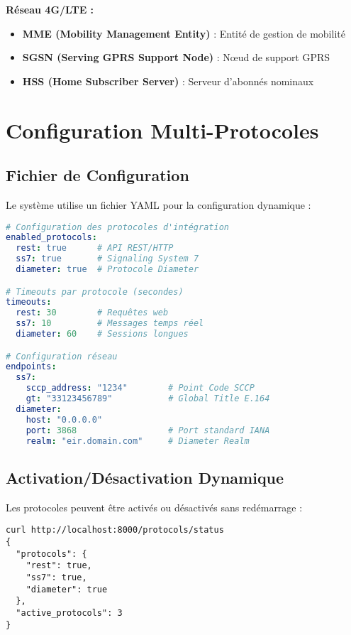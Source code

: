 \documentclass[11pt]{article}
\begin{document}
\textbf{Réseau 4G/LTE :}
\begin{itemize}
    \item \textbf{MME (Mobility Management Entity)} : Entité de gestion de mobilité
    \item \textbf{SGSN (Serving GPRS Support Node)} : Nœud de support GPRS
    \item \textbf{HSS (Home Subscriber Server)} : Serveur d'abonnés nominaux
\end{itemize}

\section{Configuration Multi-Protocoles}

\subsection{Fichier de Configuration}

Le système utilise un fichier YAML pour la configuration dynamique :

\begin{lstlisting}[language=yaml,caption=config/protocols.yml]
# Configuration des protocoles d'intégration
enabled_protocols:
  rest: true      # API REST/HTTP
  ss7: true       # Signaling System 7  
  diameter: true  # Protocole Diameter

# Timeouts par protocole (secondes)
timeouts:
  rest: 30        # Requêtes web
  ss7: 10         # Messages temps réel
  diameter: 60    # Sessions longues

# Configuration réseau
endpoints:
  ss7:
    sccp_address: "1234"        # Point Code SCCP
    gt: "33123456789"           # Global Title E.164
  diameter:
    host: "0.0.0.0"
    port: 3868                  # Port standard IANA
    realm: "eir.domain.com"     # Diameter Realm
\end{lstlisting}

\subsection{Activation/Désactivation Dynamique}

Les protocoles peuvent être activés ou désactivés sans redémarrage :

\begin{lstlisting}[caption=Vérification du statut]
curl http://localhost:8000/protocols/status
{
  "protocols": {
    "rest": true,
    "ss7": true, 
    "diameter": true
  },
  "active_protocols": 3
}
\end{lstlisting}
\end{document}
